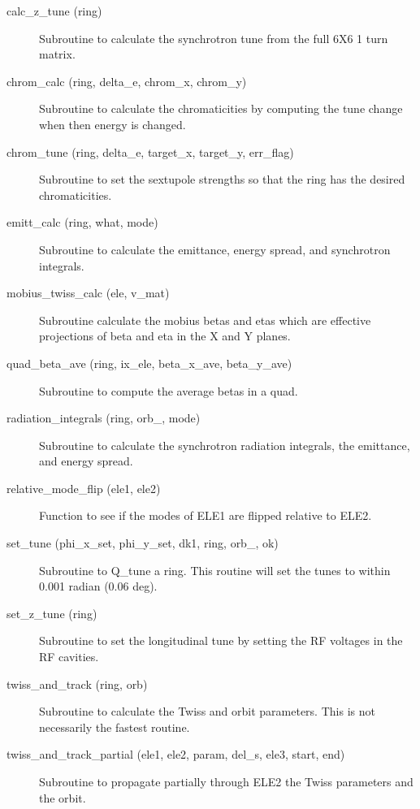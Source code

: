 \begin{description}

\item[calc\_z\_tune (ring)] \Newline
Subroutine to calculate the synchrotron tune from the full 6X6 1 turn matrix. 

\item[chrom\_calc (ring, delta\_e, chrom\_x, chrom\_y)] \Newline
Subroutine to calculate the chromaticities by computing the tune 
change when then energy is changed. 

\item[chrom\_tune (ring, delta\_e, target\_x, target\_y, err\_flag)] \Newline
Subroutine to set the sextupole strengths so that the ring 
has the desired chromaticities. 

\item[emitt\_calc (ring, what, mode)] \Newline
Subroutine to calculate the emittance, energy spread, and synchrotron integrals. 

\item[mobius\_twiss\_calc (ele, v\_mat)] \Newline
Subroutine calculate the mobius betas and etas which are effective 
projections of beta and eta in the X and Y planes. 

\item[quad\_beta\_ave (ring, ix\_ele, beta\_x\_ave, beta\_y\_ave)] \Newline
Subroutine to compute the average betas in a quad.

\item[radiation\_integrals (ring, orb\_, mode)] \Newline
Subroutine to calculate the synchrotron radiation integrals, the emittance, and energy spread. 

\item[relative\_mode\_flip (ele1, ele2)] \Newline
Function to see if the modes of ELE1 are flipped relative to ELE2. 

\item[set\_tune (phi\_x\_set, phi\_y\_set, dk1, ring, orb\_, ok)] \Newline
Subroutine to Q\_tune a ring. This routine will set the tunes to within 0.001 radian (0.06 deg). 

\item[set\_z\_tune (ring)] \Newline
Subroutine to set the longitudinal tune by setting the RF voltages in the RF cavities. 

\item[twiss\_and\_track (ring, orb)] \Newline
Subroutine to calculate the Twiss and orbit parameters. 
This is not necessarily the fastest routine. 

\item[twiss\_and\_track\_partial (ele1, ele2, param, del\_s, ele3, start, end)] \Newline
Subroutine to propagate partially through ELE2 the Twiss parameters and the orbit. 


\end{description}
